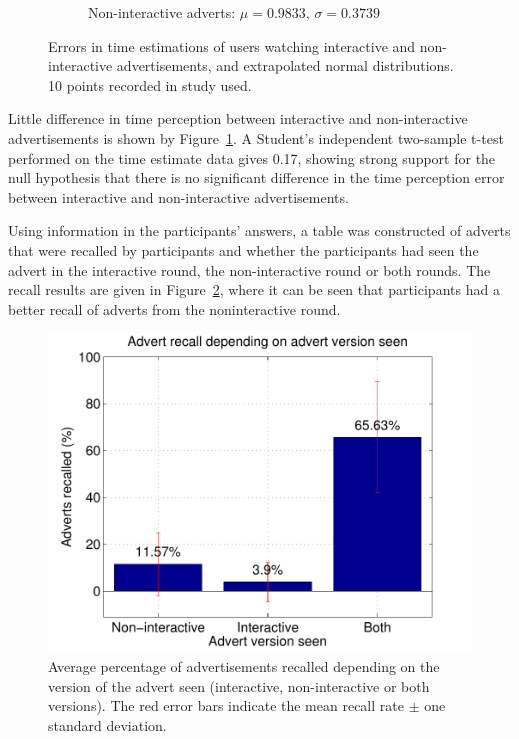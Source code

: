 \begin{figure}[!ht]
\begin{subfigure}[h]{0.49\textwidth}
			\caption{Non-interactive adverts: $\mu=0.9833$, $\sigma=0.3739$}
		\end{subfigure}
		\caption{Errors in time estimations of users watching interactive and non-interactive advertisements, and extrapolated normal distributions. 10 points recorded in study used.}
		\label{fig:time_perception}
	\end{figure}
	Little difference in time perception between interactive and non-interactive advertisements is shown by Figure~\ref{fig:time_perception}. A Student's independent two-sample t-test performed on the time estimate data gives 0.17, showing strong support for the null hypothesis that there is no significant difference in the time perception error between interactive and non-interactive advertisements.

	Using information in the participants' answers, a table was constructed of adverts that were recalled by participants and whether the participants had seen the advert in the interactive round, the non-interactive round or both rounds. The recall results are given in Figure~\ref{fig:recall}, where it can be seen that participants had a better recall of adverts from the noninteractive round. 

	\begin{figure}[!ht]
		\centering
		\includegraphics[width=\textwidth]{images/recall.pdf}
		\caption{Average percentage of advertisements recalled depending on the version of the advert seen (interactive, non-interactive or both versions). The red error bars indicate the mean recall rate $\pm$ one standard deviation.}
		\label{fig:recall}
	\end{figure}

